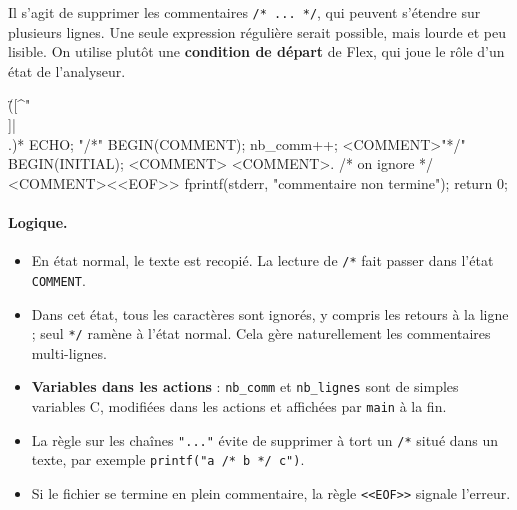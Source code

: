 \documentclass[11pt,a4paper]{article}
\begin{document}
Il s'agit de supprimer les commentaires \texttt{/* ... */}, qui peuvent s'étendre sur plusieurs
lignes. Une seule expression régulière serait possible, mais lourde et peu lisible. On utilise
plutôt une \textbf{condition de départ} de Flex, qui joue le rôle d'un état de l'analyseur.

\begin{code}
\"([^"\\\n]|\\.)*\"    { ECHO; }
"/*"                   { BEGIN(COMMENT); nb_comm++; }
<COMMENT>"*/"          { BEGIN(INITIAL); }
<COMMENT>
<COMMENT>.             { /* on ignore */ }
<COMMENT><<EOF>>       { fprintf(stderr, "commentaire non termine\n"); return 0; }
\end{code}

\begin{center}
\end{center}

\paragraph{Logique.}
\begin{itemize}[leftmargin=1.5em]
  \item En état normal, le texte est recopié. La lecture de \texttt{/*} fait passer dans l'état \texttt{COMMENT}.
  \item Dans cet état, tous les caractères sont ignorés, y compris les retours à la ligne ; seul \texttt{*/} ramène à l'état normal. Cela gère naturellement les commentaires multi-lignes.
  \item \textbf{Variables dans les actions} : \texttt{nb\_comm} et \texttt{nb\_lignes} sont de simples variables C, modifiées dans les actions et affichées par \texttt{main} à la fin.
  \item La règle sur les chaînes \texttt{"..."} évite de supprimer à tort un \texttt{/*} situé dans un texte, par exemple \texttt{printf("a /* b */ c")}.
  \item Si le fichier se termine en plein commentaire, la règle \texttt{<<EOF>>} signale l'erreur.
\end{itemize}
\end{document}
